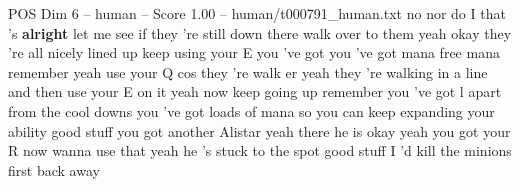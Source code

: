 \begin{textsample}{POS Dim 6 – human – Score 1.00 – human/t000791\_human.txt}  \label{ex:f6_pos_015}
no nor do I that 's \textbf{alright} let me see if they 're still down there walk over to them yeah okay they 're all nicely lined up keep using your E you 've got you 've got mana free mana remember yeah use your Q cos they 're walk er yeah they 're walking in a line and then use your E on it yeah now keep going up remember you 've got l apart from the cool downs you 've got loads of mana so you can keep expanding your ability good stuff you got another Alistar yeah there he is okay yeah you got your R now wanna use that yeah he 's stuck to the spot good stuff I 'd kill the minions first back away

\end{textsample}
